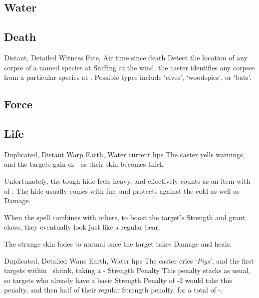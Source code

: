 \begin{multicols}{2}
\subsection{Water}


\subsection{Death}


  {Distant, Detailed}%
  {Witness}%
  {Fate, Air}%
  {time since death}%
  {Detect the location of any corpse of a named species at \spellRange}%
  {
    Sniffing at the wind, the caster identifies any corpses from a particular species at \spellRange.
    Possible types include `elves', `woodspies', or `bats'.}

\subsection{Force}


\subsection{Life}


  {Duplicated, Distant}%
  {Warp}%
  {Earth, Water}%
  {current \glspl{hp}}%
  {The caster yells warnings, and the targets gain \gls{dr}~ as their skin becomes thick}%
  {Unfortunately, the tough hide feels heavy, and effectively counts as an item with  of .
  The hide usually comes with fur, and protects against the cold as well as Damage.

  When the spell combines with others, to boost the target's Strength and grant claws, they eventually look just like a regular bear.

  The strange skin fades to normal once the target takes Damage and heals.}

  {Duplicated, Detailed}%
  {Wane}%
  {Earth, Water}%
  {\glspl{hp}}%
  {The caster cries `\textit{Pigs}', and the first  targets within \spellRange\ shrink, taking a - Strength Penalty}%
  {
  This penalty stacks as usual, so targets who already have a basic Strength Penalty of -2 would take this penalty, and then half of their regular Strength penalty, for a total of -.}


\end{multicols}
